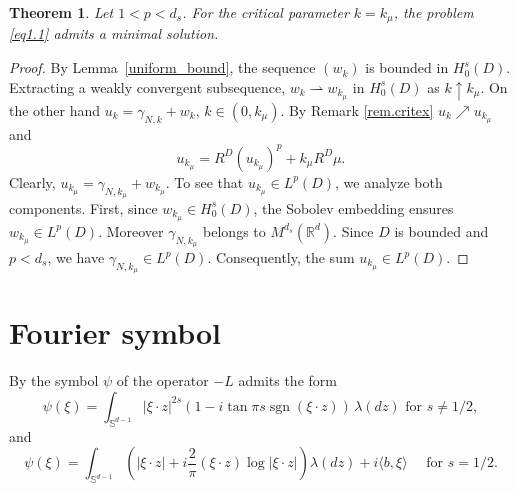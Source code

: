 \documentclass[11pt,a4paper,reqno]{amsart}
\newtheorem{theorem}{\bf Theorem}[section]
\theoremstyle{definition}
\numberwithin{equation}{section}
\begin{document}
\begin{theorem}
\label{th.critex1}
Let $1 < p < {d_s}$. For the critical parameter $k = k_\mu$, the problem \eqref{eq1.1} admits a minimal  solution.
\end{theorem}
\begin{proof}
By Lemma~\ref{uniform_bound}, the sequence $(w_k)$ is bounded in 
$H_0^s(D)$. Extracting a weakly convergent subsequence, 
$w_k \rightharpoonup w_{k_\mu}$ in $H_0^s(D)$ as $k \uparrow k_\mu$. 
On the other hand $u_k=\gamma_{N,k} + w_{k},\, k\in (0,k_\mu)$.   By Remark \ref{rem.critex}
$u_k\nearrow u_{k_\mu}$ and 
\[
u_{k_\mu}=R^D(u_{k_\mu})^p+k_\mu R^D\mu.
\]
Clearly,  $u_{k_\mu} = \gamma_{N,k_\mu} + w_{k_\mu}$.
To see that $u_{k_\mu} \in L^p(D)$, we analyze both components. First, since $w_{k_\mu} \in H_0^s(D)$, 
the Sobolev embedding ensures $w_{k_\mu} \in L^{p}(D)$. Moreover $\gamma_{N,k_\mu}$ 
belongs to $M^{{d_s}}(\mathbb R^d)$. Since $D$ is bounded and $p < {d_s}$, we have 
$\gamma_{N,k_\mu} \in L^p(D)$. Consequently, the sum $u_{k_\mu} \in L^p(D)$.
\end{proof}









\appendix

\section{Fourier symbol}

By \cite[Theorem 14.10]{Sato} the symbol $\psi$ of the operator $-L$ admits the form
\begin{equation}
\label{eq.symb1}
\psi(\xi)=\int_{\mathbb S^{d-1}}|\xi\cdot z|^{2s} (1-i \tan {\pi s} \operatorname{sgn}(\xi\cdot z))\, \lambda(dz) 
\text { for } s \neq 1/2,
\end{equation}
and
\begin{equation}
\label{eq.symb2}
\psi(\xi)= \int_{\mathbb S^{d-1}}(|\xi\cdot z|+i \frac{2}{\pi}(\xi\cdot z) \log |\xi\cdot z|) \lambda(dz)+i\langle b, \xi\rangle \quad \text { for } s=1/2.
\end{equation}
\end{document}
